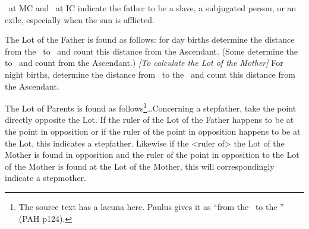 \Saturn\, at MC and \Jupiter\, at IC indicate the
father to be a slave, a subjugated person, or an exile, especially when the sun is afflicted.

The Lot of the Father is found as follows: for day births determine the distance from the \Sun\, to \Saturn\, and count this distance from the Ascendant. (Some determine the \Sun\, to \Jupiter\, and count from the Ascendant.) \textsl{[To calculate the Lot of the Mother]} For night births, determine the distance from \Venus\, to the \Moon\, and count this distance from the Ascendant. 

The Lot of Parents is found as follows\footnote{The source text has a lacuna here. Paulus gives it as ``from the \Sun\, to the \Moon'' (PAH p124).}\ldots Concerning a stepfather, take the point directly opposite the Lot. If the ruler of the Lot of the Father happens to be at the point in opposition or if the ruler of the point in opposition happens to be at the Lot, this indicates a stepfather. Likewise if the <ruler of> the Lot of the Mother is found in opposition and the ruler of the point in opposition to the Lot of the Mother is found at the Lot of the Mother, this will
correspondingly indicate a stepmother.

\newpage